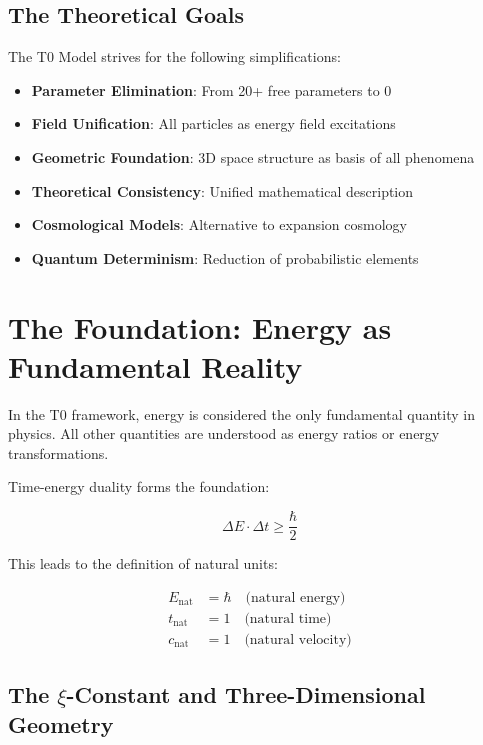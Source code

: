 	\subsection{The Theoretical Goals}
	
	The T0 Model strives for the following simplifications:
	
	\begin{itemize}
		\item \textbf{Parameter Elimination}: From 20+ free parameters to 0
		\item \textbf{Field Unification}: All particles as energy field excitations
		\item \textbf{Geometric Foundation}: 3D space structure as basis of all phenomena
		\item \textbf{Theoretical Consistency}: Unified mathematical description
		\item \textbf{Cosmological Models}: Alternative to expansion cosmology
		\item \textbf{Quantum Determinism}: Reduction of probabilistic elements
	\end{itemize}
	
	
	\section{The Foundation: Energy as Fundamental Reality}
	
	\begin{principle}
		In the T0 framework, energy is considered the only fundamental quantity in physics. All other quantities are understood as energy ratios or energy transformations.
	\end{principle}
	
	Time-energy duality forms the foundation:
	
	\begin{equation}
		\Delta E \cdot \Delta t \geq \frac{\hbar}{2}
	\end{equation}
	
	This leads to the definition of natural units:
	
	\begin{align}
		E_{\text{nat}} &= \hbar \quad \text{(natural energy)} \\
		t_{\text{nat}} &= 1 \quad \text{(natural time)} \\
		c_{\text{nat}} &= 1 \quad \text{(natural velocity)}
	\end{align}
	
	\subsection{The $\xi$-Constant and Three-Dimensional Geometry}
	
